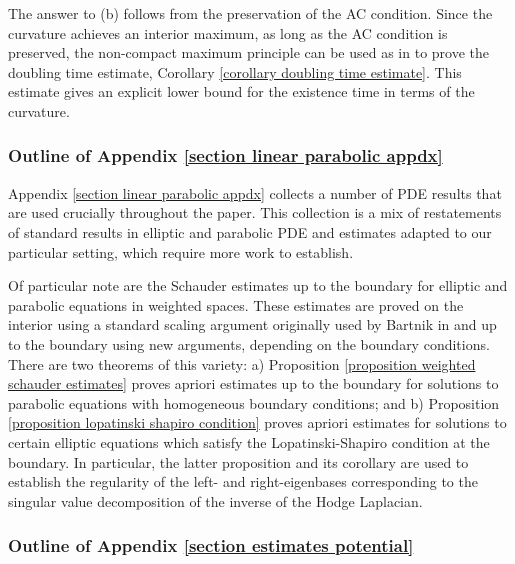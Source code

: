 \documentclass[hidelinks, 12pt, oneside, reqno]{amsart}
\begin{document}
The answer to (b) follows from the preservation of the AC condition. Since the curvature achieves an interior maximum, as long as the AC condition is preserved, the non-compact maximum principle can be used as in \cite[\S 4]{LotayWeiLaplacianFlow} to prove the doubling time estimate, Corollary \ref{corollary doubling time estimate}. This estimate gives an explicit lower bound for the existence time in terms of the curvature. 

\subsubsection{Outline of Appendix \ref{section linear parabolic appdx}}

Appendix \ref{section linear parabolic appdx} collects a number of PDE results that are used crucially throughout the paper. This collection is a mix of restatements of standard results in elliptic and parabolic PDE and estimates adapted to our particular setting, which require more work to establish. 

Of particular note are the Schauder estimates up to the boundary for elliptic and parabolic equations in weighted spaces. These estimates are proved on the interior using a standard scaling argument originally used by Bartnik in \cite{BartnikMass} and up to the boundary using new arguments, depending on the boundary conditions. There are two theorems of this variety: a) Proposition \ref{proposition weighted schauder estimates} proves apriori estimates up to the boundary for solutions to parabolic equations with homogeneous boundary conditions; and b) Proposition \ref{proposition lopatinski shapiro condition} proves apriori estimates for solutions to certain elliptic equations which satisfy the Lopatinski-Shapiro condition at the boundary. In particular, the latter proposition and its corollary are used to establish the regularity of the left- and right-eigenbases corresponding to the singular value decomposition of the inverse of the Hodge Laplacian. 

\subsubsection{Outline of Appendix \ref{section estimates potential}}
\end{document}
